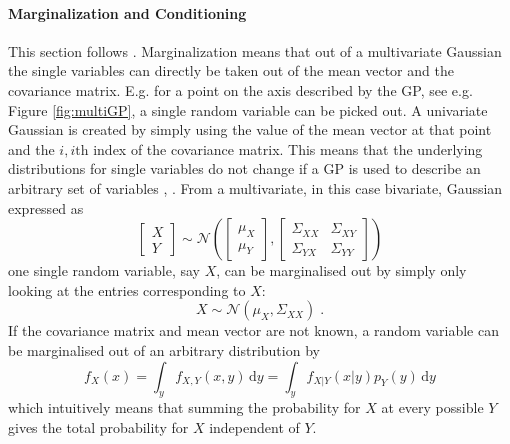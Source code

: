 \documentclass[%
  a4paper,oneside,%
  11pt,%
  smallchapters,
  style=printdev,
  extramargin,
  green,%
  rgb, <cmyk>
  ]{tubsbook}
\begin{document}
\paragraph{Marginalization and Conditioning} 
\label{sec:Marg}
This section follows \cite{gortler2019}.
Marginalization means that out of a multivariate Gaussian the single variables can directly be taken out of the mean vector and the covariance matrix. E.g. for a point on the axis described by the GP, see e.g. Figure \ref{fig:multiGP}, a single random variable can be picked out. A univariate Gaussian is created by simply using the value of the mean vector at that point and the $i,i \mathrm{th}$ index of the covariance matrix. This means that the underlying distributions for single variables do not change if a GP is used to describe an arbitrary set of variables \cite[p. 13]{rasmussen2006}, \cite{gortler2019}.
From a multivariate, in this case bivariate, Gaussian expressed as
\begin{equation}
\begin{bmatrix}
           X \\
           Y
         \end{bmatrix} \sim \mathcal{N}\left( \begin{bmatrix}
           \mu_X \\
           \mu_Y
         \end{bmatrix}, \begin{bmatrix}
\Sigma_{XX} & \Sigma_{XY} \\
\Sigma_{YX} & \Sigma_{YY} 
\end{bmatrix}  \right)
\end{equation}
one single random variable, say $X$, can be marginalised out by simply only looking at the entries corresponding to $X$:
\begin{equation}
X \sim \mathcal{N}(\mu_X, \Sigma_{XX}) \;.
\end{equation}
If the covariance matrix and mean vector are not known, a random variable can be marginalised out of an arbitrary distribution by
\begin{equation}
f_X(x) = \int_y f_{X,Y}(x,y)\,\mathrm{d}y = \int_y f_{X|Y}(x|y)p_Y(y)\,\mathrm{d}y
\label{eqn:margi}
\end{equation}
which intuitively means that summing the probability for $X$ at every possible $Y$ gives the total probability for $X$ independent of $Y$. 
\end{document}
